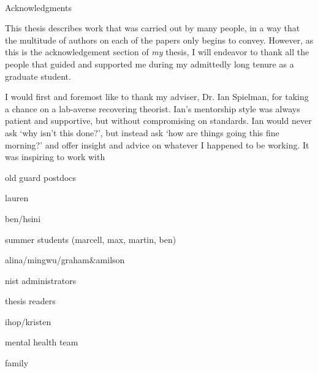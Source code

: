 
\renewcommand{\baselinestretch}{2}
\small\normalsize
\hbox{\ }
 
\vspace{-.65in}

\begin{center}
\large{Acknowledgments} 
\end{center} 

\vspace{1ex}

This thesis describes work that was carried out by many people, in a way that the multitude of authors on each of the papers only begins to convey. However, as this is the acknowledgement section of {\it my} thesis, I will endeavor to thank all the people that guided and supported me during my admittedly long tenure as a graduate student. 

I would first and foremost like to thank my adviser, Dr. Ian Spielman, for taking a chance on a lab-averse recovering theorist. Ian's mentorship style was always patient and supportive, but without compromising on standards. Ian would never ask \lq{why isn't this done?}\rq{}, but instead ask \lq{how are things going this fine morning?}\rq{} and offer insight and advice on whatever I happened to be working. It was inspiring to work with 

old guard postdocs

lauren

ben/hsini

summer students (marcell, max, martin, ben)

alina/mingwu/graham&amilson

nist administrators

thesis readers

ihop/kristen

mental health team

family